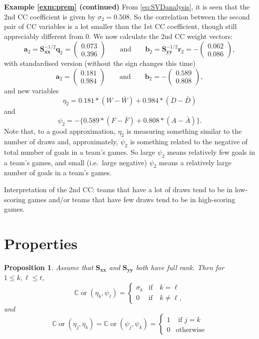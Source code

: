\documentclass[]{book}
\newtheorem{proposition}{Proposition}[chapter]
\theoremstyle{definition}
\theoremstyle{definition}
\theoremstyle{definition}
\theoremstyle{remark}
\begin{document}
\textbf{Example \ref{exm:prem} (continued)} From \eqref{eq:SVDanalysis}, it is seen that the 2nd CC coefficient is given by \(\sigma_2=0.508\). So the correlation between the second pair of CC variables is a lot smaller than the 1st CC coefficient, though still appreciably different from \(0\). We now calculate the 2nd CC weight vectors:
\[
\boldsymbol a_2=\boldsymbol S_{\boldsymbol x\boldsymbol x}^{-1/2} \boldsymbol q_2 = \begin{pmatrix} 0.073 \\ 0.396 \end{pmatrix}
\qquad \text{and} \qquad
\boldsymbol b_2=\boldsymbol S_{\boldsymbol y\boldsymbol y}^{-1/2}\boldsymbol r_2=-\begin{pmatrix}0.062\\ 0.086  \end{pmatrix},
\]
with standardised version (without the sign changes this time)
\[
\boldsymbol a_2=\begin{pmatrix}0.181 \\ 0.984  \end{pmatrix}
\qquad \text{and} \qquad
\boldsymbol b_2=-\begin{pmatrix}0.589 \\ 0.808  \end{pmatrix},
\]
and new variables
\[
\eta_2=0.181*(W-\bar{W}) +0.984*(D -\bar{D})
\]
and
\[
\psi_2=-\{0.589*(F-\bar{F})+0.808*(A-\bar{A})\}.
\]
Note that, to a good approximation, \(\eta_2\) is measuring something similar to the number of draws and, approximately, \(\psi_2\) is something related to the negative of total number of goals in a team's games. So large \(\psi_2\) means relatively few goals in a team's games, and small (i.e.~large negative) \(\psi_2\) means a relatively large number of goals in a team's games.

Interpretation of the 2nd CC: teams that have a lot of draws tend to be in low-scoring games and/or teams that have few draws tend to be in high-scoring games.

\hypertarget{properties}{%
\section{Properties}\label{properties}}

\begin{proposition}
\protect\hypertarget{prp:ccavar}{}{\label{prp:ccavar} }Assume that \(\boldsymbol S_{\boldsymbol x\boldsymbol x}\) and \(\boldsymbol S_{\boldsymbol y\boldsymbol y}\) both have full rank. Then for \(1 \leq k,\ell \leq t\),
\[
{\mathbb{C}\operatorname{or}}(\eta_k,  \psi_{\ell})=\begin{cases} \sigma_k &\text{if} \quad k=\ell\\
0 & \text{if} \quad k \neq \ell, \end{cases}
\]
and
\[{\mathbb{C}\operatorname{or}}(\eta_j, \eta_k)= {\mathbb{C}\operatorname{or}}(\psi_j, \psi_k)=\begin{cases}
1 &\mbox{ if } j=k\\
0 &\mbox{otherwise}
\end{cases}
\]
\end{proposition}
\end{document}
